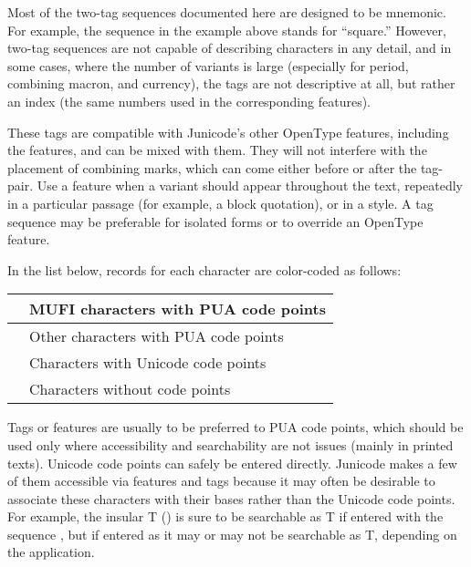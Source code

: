 Most of the two-tag sequences documented here are designed to be mnemonic. For example, the
 sequence in the example
above stands for ``square.'' However, two-tag sequences are not capable of describing characters in any detail, and in
some cases, where the number of variants is large (especially for period, combining macron, and currency), the tags are
not descriptive at all, but rather an index (the same numbers used in the corresponding  features).

These tags are compatible with Junicode's other OpenType features, including the  features, 
and can be mixed with
them. They will not interfere with the placement of combining marks, which can come either before or after the tag-pair. 
Use a  feature when a variant should appear
throughout the text, repeatedly in a particular passage (for example, a block quotation), or in a style. A tag sequence may be preferable for isolated forms or to override an OpenType feature.

In the list below, records for each character are color-coded as follows:

\begin{center}
  \tablefirsthead{}
  \tablehead{}
  \tabletail{\hline}
  \tablelasttail{\hline}
  \begin{supertabular}{|m{13mm}|m{72mm}|}
    \hline
     & MUFI characters with PUA code points\\\hline
     & Other characters with PUA code points\\\hline
     & Characters with Unicode code points\\\hline
     & Characters without code points\\
  \end{supertabular}
\end{center}

\noindent Tags or  features are usually to be preferred to PUA code points,
which should be used only where accessibility and searchability are
not issues (mainly in printed texts). Unicode code points can safely be
entered directly. Junicode makes a few of them accessible via  features and tags because it may often
be desirable to associate these characters with their bases rather than the Unicode code points. For
example, the insular T () is sure to be searchable as T if entered with the sequence
, but if entered as  it may or may not be searchable as T,
depending on the application.

